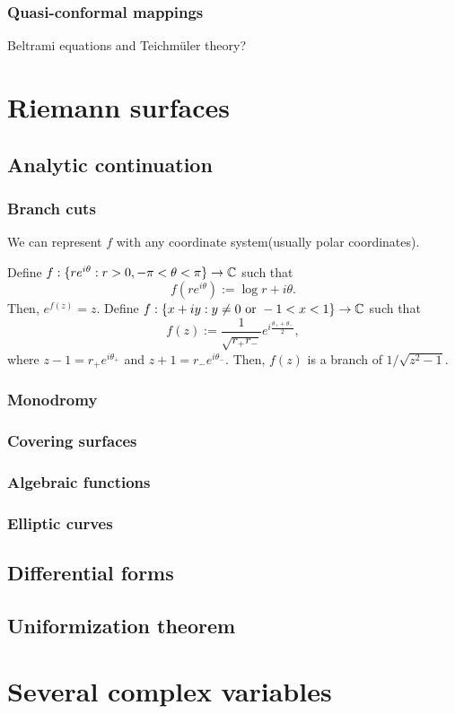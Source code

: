 \documentclass{../../large}
\begin{document}
\section{Quasi-conformal mappings}
Beltrami equations and Teichm\"uler theory?











\part{Riemann surfaces}

\chapter{Analytic continuation}
\section{Branch cuts}
We can represent $f$ with any coordinate system(usually polar coordinates).

Define $f:\{re^{i\theta}:r>0,-\pi<\theta<\pi\}\to\mathbb{C}$ such that
\[f(re^{i\theta}):=\log r+i\theta.\]
Then, $e^{f(z)}=z$.
Define $f:\{x+iy:y\ne0\text{ or }-1<x<1\}\to\mathbb{C}$ such that
\[f(z):=\frac1{\sqrt{r_+r_-}}e^{i\frac{\theta_++\theta_-}2},\]
where $z-1=r_+e^{i\theta_+}$ and $z+1=r_-e^{i\theta_-}$.
Then, $f(z)$ is a branch of $1/\sqrt{z^2-1}$.


\section{Monodromy}
\section{Covering surfaces}
\section{Algebraic functions}
\section{Elliptic curves}

\chapter{Differential forms}

\chapter{Uniformization theorem}




\part{Several complex variables}
\end{document}
